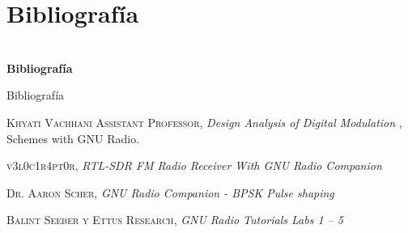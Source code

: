 \section{Bibliografía}

\begin{frame}{}


\bfseries{\textrm{\LARGE \\Bibliografía}}
\raggedright
\end{frame}



\begin{frame}{Bibliografía}


\begin{thebibliography}{X}

 \textsc{Khyati Vachhani Assistant Professor}, 
\textit{Design Analysis of Digital Modulation }, Schemes with GNU Radio.


 \textsc{v3l0c1r4pt0r}, 
\textit{RTL-SDR FM Radio Receiver With GNU Radio Companion }


 \textsc{ Dr. Aaron Scher}, 
\textit{GNU Radio Companion - BPSK Pulse shaping}

 \textsc{ Balint Seeber y
Ettus Research}, 
\textit{GNU Radio Tutorials
Labs 1 – 5}

\end{thebibliography}
\end{frame}